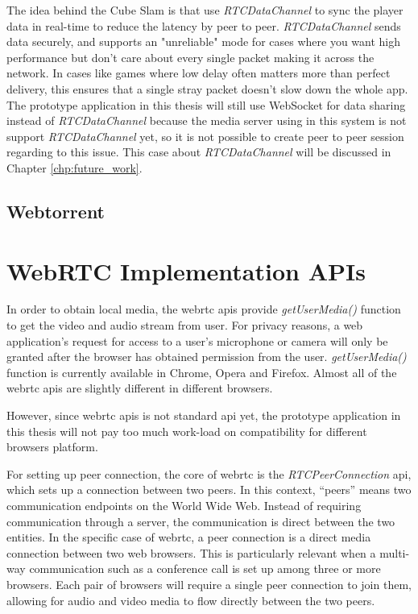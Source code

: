 \par The idea behind the Cube Slam is that use \textit{RTCDataChannel} to sync the player data in real-time to reduce the latency by peer to peer. \textit{RTCDataChannel} sends data securely, and supports an "unreliable" mode for cases where you want high performance but don't care about every single packet making it across the network. In cases like games where low delay often matters more than perfect delivery, this ensures that a single stray packet doesn't slow down the whole app. The prototype application in this thesis will still use WebSocket for data sharing instead of \textit{RTCDataChannel} because the media server using in this system is not support \textit{RTCDataChannel} yet, so it is not possible to create peer to peer session regarding to this issue. This case about \textit{RTCDataChannel} will be discussed in Chapter \ref{chp:future_work}.

\subsection{Webtorrent}


\section{WebRTC Implementation APIs}

\par In order to obtain local media, the \gls{webrtc} \gls{api}s provide \textit{getUserMedia()} function to get the video and audio stream from user. For privacy reasons, a web application’s request for access to a user’s microphone or camera will only be granted after the browser has obtained permission from the user. \textit{getUserMedia()} function is currently available in Chrome, Opera and Firefox. Almost all of the \gls{webrtc} \gls{api}s are slightly different in different browsers.


However, since \gls{webrtc} \gls{api}s is not standard \gls{api} yet, the prototype application in this thesis will not pay too much work-load on compatibility for different browsers platform.

\par For setting up peer connection, the core of \gls{webrtc} is the \textit{RTCPeerConnection} \gls{api}, which sets up a connection between two peers. In this context, “peers” means two communication endpoints on the World Wide Web. Instead of requiring communication through a server, the communication is direct between the two entities. In the specific case of \gls{webrtc}, a peer connection is a direct media connection between two web browsers. This is particularly relevant when a multi-way communication such as a conference call is set up among three or more browsers. Each pair of browsers will require a single peer connection to join them, allowing for audio and video media to flow directly between the two peers. 

